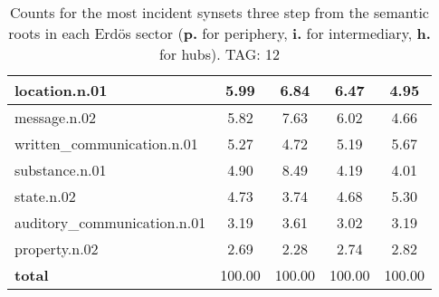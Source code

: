 \begin{table}[h!]
\begin{center}
\begin{tabular}{| l || c | c | c | c |}
location.n.01 & 5.99  & 6.84  & 6.47  & 4.95 \\\hline
message.n.02 & 5.82  & 7.63  & 6.02  & 4.66 \\\hline
written\_communication.n.01 & 5.27  & 4.72  & 5.19  & 5.67 \\\hline
substance.n.01 & 4.90  & 8.49  & 4.19  & 4.01 \\\hline
state.n.02 & 4.73  & 3.74  & 4.68  & 5.30 \\\hline
auditory\_communication.n.01 & 3.19  & 3.61  & 3.02  & 3.19 \\\hline
property.n.02 & 2.69  & 2.28  & 2.74  & 2.82 \\\hline\hline
{{\bf total}} & 100.00  & 100.00  & 100.00  & 100.00 \\\hline
\end{tabular}
\caption{Counts for the most incident synsets three step from the semantic roots in each Erd\"os sector ({\bf p.} for periphery, {\bf i.} for intermediary, {\bf h.} for hubs). TAG: 12}
\end{center}
\end{table}